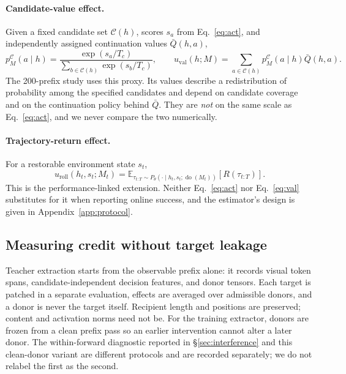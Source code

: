 \documentclass{article}
\newcommand{\E}{\mathbb{E}}
\begin{document}
\paragraph{Candidate-value effect.} Given a fixed candidate set $\mathcal C(h)$,
scores $s_a$ from Eq.~\eqref{eq:act}, and independently assigned continuation
values $\bar Q(h,a)$,
\begin{equation}
 p^\mathcal C_M(a\mid h)=\frac{\exp(s_a/T_c)}{\sum_{b\in\mathcal C(h)}\exp(s_b/T_c)},
 \qquad
 u_{\mathrm{val}}(h;M)=\sum_{a\in\mathcal C(h)}p^\mathcal C_M(a\mid h)\bar Q(h,a).
 \label{eq:val}
\end{equation}
The 200-prefix study uses this proxy. Its values describe a redistribution of
probability among the specified candidates and depend on candidate coverage and
on the continuation policy behind $\bar Q$. They are \emph{not} on the same
scale as Eq.~\eqref{eq:act}, and we never compare the two numerically.

\paragraph{Trajectory-return effect.} For a restorable environment state $s_t$,
\begin{equation}
 u_{\mathrm{roll}}(h_t,s_t;M_t)
   =\E_{\tau_{t:T}\sim P_\theta(\cdot\mid h_t,s_t;\operatorname{do}(M_t))}
        [R(\tau_{t:T})].
 \label{eq:roll}
\end{equation}
This is the performance-linked extension. Neither Eq.~\eqref{eq:act} nor
Eq.~\eqref{eq:val} substitutes for it when reporting online success, and the
estimator's design is given in Appendix~\ref{app:protocol}.

\subsection{Measuring credit without target leakage}
\label{sec:teacher}

Teacher extraction starts from the observable prefix alone: it records visual
token spans, candidate-independent decision features, and donor tensors. Each
target is patched in a separate evaluation, effects are averaged over admissible
donors, and a donor is never the target itself. Recipient length and positions
are preserved; content and activation norms need not be. For the training
extractor, donors are frozen from a clean prefix pass so an earlier intervention
cannot alter a later donor. The within-forward diagnostic reported in
\S\ref{sec:interference} and this clean-donor variant are different protocols
and are recorded separately; we do not relabel the first as the second.
\end{document}
